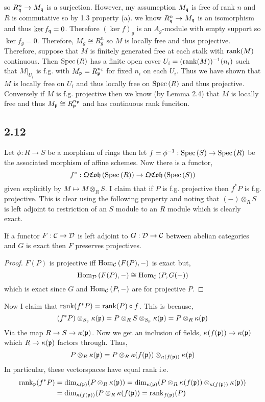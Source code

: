 \documentclass[12pt]{article}
\begin{document}
so $R_{\mathfrak{q}}^n \to M_{\mathfrak{q}}$ is a surjection. However, my assumeption $M_{\mathfrak{q}}$ is free of rank $n$ and $R$ is commutative so by 1.3 property (a). we know $R_{\mathfrak{q}}^n \to M_{\mathfrak{q}}$ is an isomorphism and thus $\ker{f}_{\mathfrak{q}} = 0$. Therefore $(\ker{f})_g$ is an $A_g$-module with empty support so $\ker{f}_g = 0$. Therefore, $M_g \cong R_g^n$ so $M$ is locally free and thus projective.
\bigskip\\
Therefore, suppose that $M$ is finitely generated free at each stalk with $\mathrm{rank}(M)$ continuous. Then $\mathrm{Spec}\left( R \right)$ has a finite open cover $U_i = (\mathrm{rank}(M))^{-1}(n_i)$ such that $M|_{U_i}$ is f.g. with $M_{\mathfrak{p}} = R_{\mathfrak{p}}^{n_i}$ for fixed $n_i$ on each $U_i$. Thus we have shown that $M$ is locally free on $U_i$ and thus locally free on $\mathrm{Spec}\left( R \right)$ and thus projective. Conversely if $M$ is f.g. projective then we know (by Lemma 2.4) that $M$ is locally free and thus $M_{\mathfrak{p}} \cong R_{\mathfrak{p}}^{n_{\mathfrak{p}}}$ and has continuous rank funciton.   


\subsection{2.12}

Let $\phi : R \to S$ be a morphism of rings then let $f = \phi^{-1} : \mathrm{Spec}\left( S \right) \to \mathrm{Spec}\left( R \right)$ be the associated morphism of affine schemes. Now there is a functor,
\[ f^* : \mathfrak{QCoh}\left(\mathrm{Spec}\left( R \right)\right) \to \mathfrak{QCoh}\left(\mathrm{Spec}\left( S \right)\right) \] given explicitly by $M \mapsto M \otimes_R S$. I claim that if $P$ is f.g. projective then $f^* P$ is f.g. projective. This is clear using the following property and noting that $(-) \otimes_R S$ is left adjoint to restriction of an $S$ module to an $R$ module which is clearly exact.

\begin{lemma}
If a functor $F : \mathcal{C} \to \mathcal{D}$ is left adjoint to $G : \mathcal{D} \to \mathcal{C}$ between abelian categories and $G$ is exact then $F$ preserves projectives. 
\end{lemma}

\begin{proof}
$F(P)$ is projective iff $\text{Hom}_{\mathcal{C}}\left( F(P), - \right)$ is exact but,
\[ \text{Hom}_{\mathcal{D}}\left( F(P), - \right) \cong \text{Hom}_{\mathcal{C}}\left( P, G(-) \right) \] which is exact since $G$ and $\text{Hom}_{\mathcal{C}}\left( P, - \right)$ are for projective $P$. 
\end{proof}

Now I claim that $\mathrm{rank}(f^* P) = \mathrm{rank}(P) \circ f$. This is because,
\[ (f^* P) \otimes_{S_{\mathfrak{p}}} \kappa(\mathfrak{p}) = P \otimes_R S \otimes_{S_{\mathfrak{p}}} \kappa(\mathfrak{p}) = P \otimes_R \kappa(\mathfrak{p}) \]
Via the map $R \to S \to \kappa(\mathfrak{p})$. Now we get an inclusion of fields, $\kappa(f(\mathfrak{p})) \to \kappa(\mathfrak{p})$ which $R \to \kappa(\mathfrak{p})$ factors through. Thus,
\[ P \otimes_R \kappa(\mathfrak{p}) = P \otimes_R \kappa(f(\mathfrak{p})) \otimes_{\kappa(f(\mathfrak{p}))} \kappa(\mathfrak{p}) \]
In particular, these vectorspaces have equal rank i.e.
\begin{align*}
\mathrm{rank}_{\mathfrak{p}}(f^* P) & = \dim_{\kappa(\mathfrak{p})} (P \otimes_R \kappa(\mathfrak{p})) = \dim_{\kappa(\mathfrak{p})} (P \otimes_R \kappa(f(\mathfrak{p})) \otimes_{\kappa(f(\mathfrak{p}))} \kappa(\mathfrak{p})) 
\\
& = \dim_{\kappa(f(\mathfrak{p}))} (P \otimes_R \kappa(f(\mathfrak{p})) = \mathrm{rank}_{f(\mathfrak{p})}(P) 
\end{align*}
\end{document}
